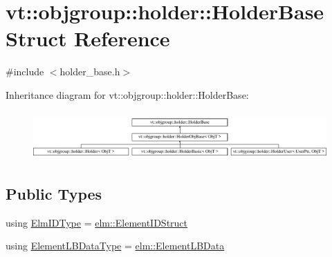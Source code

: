 \hypertarget{structvt_1_1objgroup_1_1holder_1_1_holder_base}{}\section{vt\+:\+:objgroup\+:\+:holder\+:\+:Holder\+Base Struct Reference}
\label{structvt_1_1objgroup_1_1holder_1_1_holder_base}


{\ttfamily \#include $<$holder\+\_\+base.\+h$>$}

Inheritance diagram for vt\+:\+:objgroup\+:\+:holder\+:\+:Holder\+Base\+:\begin{figure}[H]
\begin{center}
\leavevmode
\includegraphics[height=1.866667cm]{structvt_1_1objgroup_1_1holder_1_1_holder_base}
\end{center}
\end{figure}
\subsection*{Public Types}
\begin{DoxyCompactItemize}
\item 
using \hyperlink{structvt_1_1objgroup_1_1holder_1_1_holder_base_a89c0ce1f23237ab00aee86d4d339bc50}{Elm\+I\+D\+Type} = \hyperlink{structvt_1_1elm_1_1_element_i_d_struct}{elm\+::\+Element\+I\+D\+Struct}
\item 
using \hyperlink{structvt_1_1objgroup_1_1holder_1_1_holder_base_a53deb78d918d7281cf01a0f09e410411}{Element\+L\+B\+Data\+Type} = \hyperlink{structvt_1_1elm_1_1_element_l_b_data}{elm\+::\+Element\+L\+B\+Data}
\end{DoxyCompactItemize}
